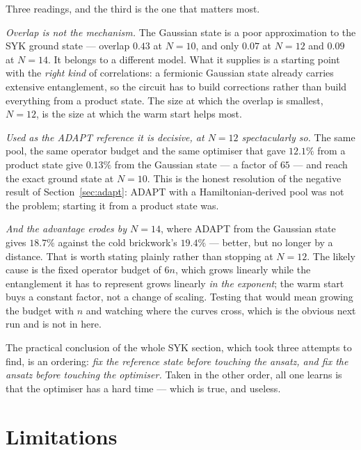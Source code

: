 \documentclass[10pt,a4paper]{article}
\begin{document}
Three readings, and the third is the one that matters most.

\emph{Overlap is not the mechanism.} The Gaussian state is a poor
approximation to the SYK ground state --- overlap $0.43$ at $N=10$, and only
$0.07$ at $N=12$ and $0.09$ at $N=14$. It belongs to a different model. What it
supplies is a starting point with the \emph{right kind} of correlations: a
fermionic Gaussian state already carries extensive entanglement, so the circuit
has to build corrections rather than build everything from a product state.
The size at which the overlap is smallest, $N=12$, is the size at which the
warm start helps most.

\emph{Used as the ADAPT reference it is decisive, at $N=12$ spectacularly so.}
The same pool, the same operator budget and the same optimiser that gave
$12.1\%$ from a product state give $0.13\%$ from the Gaussian state --- a factor
of $65$ --- and reach the exact ground state at $N=10$. This is the honest
resolution of the negative result of Section~\ref{sec:adapt}: ADAPT with a
Hamiltonian-derived pool was not the problem; starting it from a product state
was.

\emph{And the advantage erodes by $N=14$}, where ADAPT from the Gaussian state
gives $18.7\%$ against the cold brickwork's $19.4\%$ --- better, but no longer
by a distance. That is worth stating plainly rather than stopping at $N=12$.
The likely cause is the fixed operator budget of $6n$, which grows linearly
while the entanglement it has to represent grows linearly \emph{in the exponent};
the warm start buys a constant factor, not a change of scaling. Testing that
would mean growing the budget with $n$ and watching where the curves cross,
which is the obvious next run and is not in here.

The practical conclusion of the whole SYK section, which took three attempts to
find, is an ordering: \emph{fix the reference state before touching the ansatz,
and fix the ansatz before touching the optimiser.} Taken in the other order,
all one learns is that the optimiser has a hard time --- which is true, and
useless.

\section{Limitations}
\end{document}
